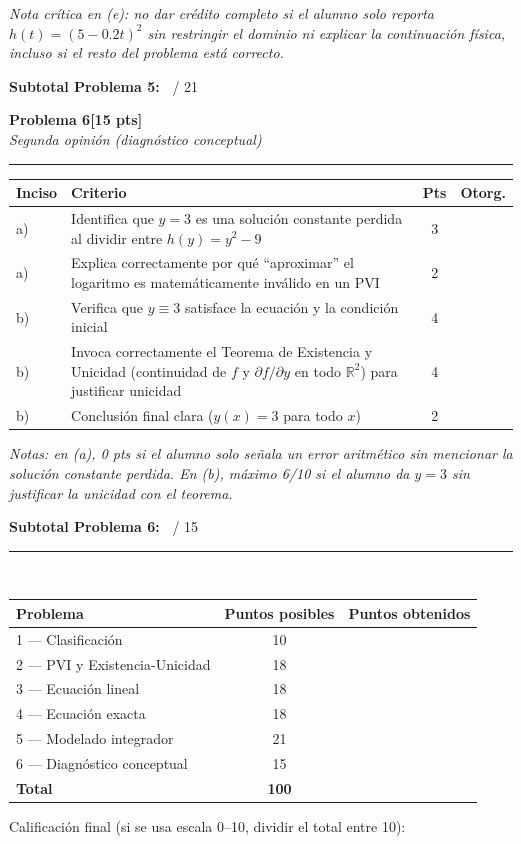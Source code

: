 \documentclass[11pt,letterpaper]{article}
\makeatletter
\newcommand{\problema}[3]{%
  \bigskip\bigskip\noindent
  {\Large\textbf{Problema #1}}\hfill\textbf{[#2 pts]}\\[3pt]
  {\small\itshape #3}\par
  \vspace{2pt}\hrule\vspace{8pt}
}
\newenvironment{tablarubrica}{%
  \begin{tabular}{@{}p{1.1cm}Lcc@{}}
  \toprule
  \textbf{Inciso} & \textbf{Criterio} & \textbf{Pts} & \textbf{Otorg.} \\
  \midrule
}{%
  \bottomrule
  \end{tabular}
}
\makeatother
\begin{document}
\textit{Nota crítica en (e): no dar crédito completo si el alumno solo reporta $h(t)=(5-0.2t)^2$ sin restringir el dominio ni explicar la continuación física, incluso si el resto del problema está correcto.}

\medskip
\noindent\textbf{Subtotal Problema 5:\ } \underline{\hspace{2.5cm}} / 21

\newpage
\problema{6}{15}{Segunda opinión (diagnóstico conceptual)}

\begin{tablarubrica}
a) & Identifica que $y=3$ es una solución constante perdida al dividir entre $h(y)=y^2-9$ & 3 & \\
a) & Explica correctamente por qué ``aproximar'' el logaritmo es matemáticamente inválido en un PVI & 2 & \\
b) & Verifica que $y\equiv3$ satisface la ecuación y la condición inicial & 4 & \\
b) & Invoca correctamente el Teorema de Existencia y Unicidad (continuidad de $f$ y $\partial f/\partial y$ en todo $\mathbb{R}^2$) para justificar unicidad & 4 & \\
b) & Conclusión final clara ($y(x)=3$ para todo $x$) & 2 & \\
\end{tablarubrica}

\textit{Notas: en (a), 0 pts si el alumno solo señala un error aritmético sin mencionar la solución constante perdida. En (b), máximo 6/10 si el alumno da $y=3$ sin justificar la unicidad con el teorema.}

\medskip
\noindent\textbf{Subtotal Problema 6:\ } \underline{\hspace{2.5cm}} / 15

\vspace{14pt}\hrule\vspace{10pt}

\\[4pt]
\begin{tabular}{lcc}
\toprule
Problema & Puntos posibles & Puntos obtenidos \\
\midrule
1 --- Clasificación & 10 & \\
2 --- PVI y Existencia-Unicidad & 18 & \\
3 --- Ecuación lineal & 18 & \\
4 --- Ecuación exacta & 18 & \\
5 --- Modelado integrador & 21 & \\
6 --- Diagnóstico conceptual & 15 & \\
\midrule
\textbf{Total} & \textbf{100} & \\
\bottomrule
\end{tabular}

\vspace{10pt}
\noindent Calificación final (si se usa escala 0--10, dividir el total entre 10): \underline{\hspace{3cm}}
\end{document}
